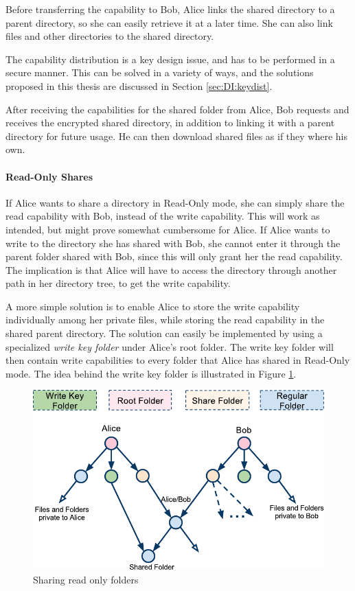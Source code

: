 \documentclass[pdftex,english,10pt,b5paper,twoside]{book}
\begin{document}
Before transferring the capability to Bob, Alice links the shared directory
to a parent directory, so she can easily retrieve it at a later time. She can
also link files and other directories to the shared directory.

The capability distribution is a key design issue, and has to be performed in a
secure manner. This can be solved in a variety of ways, and the solutions
proposed in this thesis are discussed in Section \ref{sec:DI:keydist}.

After receiving the capabilities for the shared folder from Alice, Bob requests
and receives the encrypted shared directory, in addition to linking it with a
parent directory for future usage. He can then download shared files as if they
where his own.

\paragraph{Read-Only Shares}

If Alice wants to share a directory in Read-Only mode, she can simply share the
read capability with Bob, instead of the write capability. This will work as
intended, but might prove somewhat cumbersome for Alice. If Alice wants to
write to the directory she has shared with Bob, she cannot enter it through
the parent folder shared with Bob, since this will only grant her the read
capability. The implication is that Alice will have to access the directory
through another path in her directory tree, to get the write capability.

A more simple solution is to enable Alice to store the write capability
individually among her private files, while storing the read capability in the
shared parent directory. The solution can easily be implemented by using a
specialized \emph{write key folder} under Alice's root folder. The write key
folder will then contain write capabilities to every folder that Alice has
shared in Read-Only mode. The idea behind the write key folder is illustrated
in Figure \ref{fig:AS:readonly}.

\begin{figure}[h!]
    \centering
    \includegraphics[width=\columnwidth]{ArchitectureShareReadOnlyFolder.pdf}
    \caption{Sharing read only folders}
    \label{fig:AS:readonly}
\end{figure}
\end{document}
